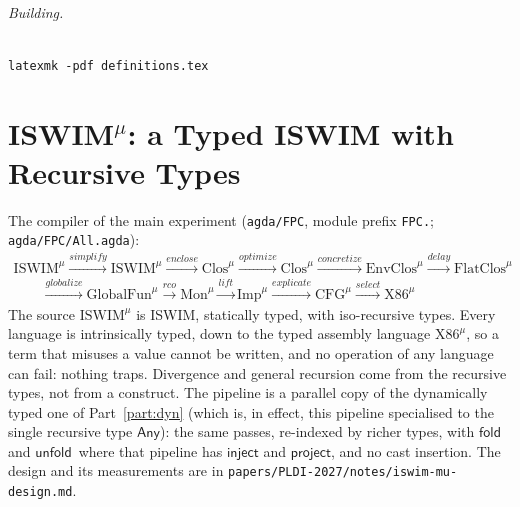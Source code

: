 \documentclass[10pt]{article}
\theoremstyle{acmplain}
\newcommand{\key}[1]{\mathsf{#1}}
\newcommand{\pass}[1]{\mathit{#1}}
\newcommand{\TAny}{\key{Any}}
\newcommand{\Ml}[1]{\textrm{#1}^{\mu}}                  %
\newcommand{\Mfold}{\key{fold}\,}
\newcommand{\Munfold}{\key{unfold}\,}
\begin{document}
\paragraph{Building.} \texttt{latexmk -pdf definitions.tex}
\part{ISWIM\texorpdfstring{$^{\mu}$}{-mu}: a Typed ISWIM with Recursive Types}\label{part:mu}

The compiler of the main experiment (\texttt{agda/FPC}, module prefix
\texttt{FPC.}; \texttt{agda/FPC/All.agda}):
\[
\begin{array}{l}
\Ml{ISWIM} \xrightarrow{\pass{simplify}} \Ml{ISWIM}
  \xrightarrow{\pass{enclose}} \Ml{Clos} \xrightarrow{\pass{optimize}} \Ml{Clos}
  \xrightarrow{\pass{concretize}} \Ml{EnvClos} \xrightarrow{\pass{delay}} \Ml{FlatClos} \\
\qquad \xrightarrow{\pass{globalize}} \Ml{GlobalFun} \xrightarrow{\pass{rco}} \Ml{Mon}
  \xrightarrow{\pass{lift}} \Ml{Imp} \xrightarrow{\pass{explicate}} \Ml{CFG}
  \xrightarrow{\pass{select}} \Ml{X86}
\end{array}
\]
The source $\Ml{ISWIM}$ is ISWIM, statically typed, with iso-recursive
types. Every language is intrinsically typed, down to the typed assembly
language $\Ml{X86}$, so a term that misuses a value cannot be written, and
no operation of any language can fail: nothing traps. Divergence and
general recursion come from the recursive types, not from a construct.
The pipeline is a parallel copy of the dynamically typed one of
Part~\ref{part:dyn} (which is, in effect, this pipeline specialised to
the single recursive type $\TAny$): the same passes, re-indexed by
richer types, with $\Mfold$ and $\Munfold$ where that pipeline has
$\key{inject}$ and $\key{project}$, and no cast insertion. The design
and its measurements are in \texttt{papers/PLDI-2027/notes/iswim-mu-design.md}.
\end{document}
